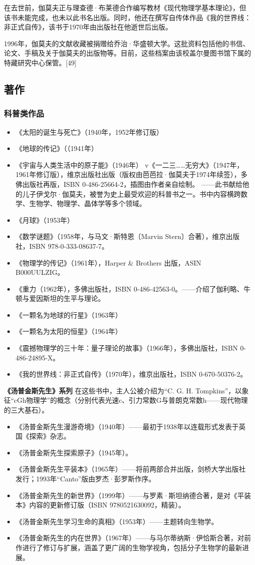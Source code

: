 在去世前，伽莫夫正与理查德·布莱德合作编写教材《现代物理学基本理论》，但该书未能完成，也未以此书名出版。同时，他还在撰写自传体作品《我的世界线：非正式自传》，该书于1970年由出版社在他逝世后出版。

1996年，伽莫夫的文献收藏被捐赠给乔治·华盛顿大学。这批资料包括他的书信、论文、手稿及关于伽莫夫的出版物等。目前，这些档案由该校盖尔曼图书馆下属的特藏研究中心保管。[49]
\subsection{著作}
\subsubsection{科普类作品}
\begin{itemize}
\item 《太阳的诞生与死亡》（1940年，1952年修订版）
\item 《地球的传记》（（1941年）
\item 《宇宙与人类生活中的原子能》（1946年）
v《一二三……无穷大》（1947年，1961年修订版），维京出版社出版（版权由芭芭拉·伽莫夫于1974年续签），多佛出版社再版，ISBN 0-486-25664-2，插图由作者亲自绘制。
  ——此书献给他的儿子伊戈尔·伽莫夫，被誉为史上最受欢迎的科普书之一。书中内容横跨数学、生物学、物理学、晶体学等多个领域。
\item 《月球》（1953年）
\item 《数学谜题》（1958年，与马文·斯特恩〔Marvin Stern〕合著），维京出版社，ISBN 978-0-333-08637-7。
\item 《物理学的传记》（1961年），Harper & Brothers 出版，ASIN B000UULZIG。
\item 《重力（1962年），多佛出版社，ISBN 0-486-42563-0。——介绍了伽利略、牛顿与爱因斯坦的生平与理论。
\item 《一颗名为地球的行星》（1963年）
\item 《一颗名为太阳的恒星》（1964年）
\item 《震撼物理学的三十年：量子理论的故事》（1966年），多佛出版社，ISBN 0-486-24895-X。
\item 《我的世界线：非正式自传》（1970年），维京出版社，ISBN 0-670-50376-2。
\end{itemize}
\textbf{《汤普金斯先生》系列}
在这些书中，主人公被介绍为“C. G. H. Tompkins”，以象征“cGh物理学”的概念（分别代表光速c、引力常数G与普朗克常数h——现代物理的三大基石）。
\begin{itemize}
\item 《汤普金斯先生漫游奇境》（1940年）——最初于1938年以连载形式发表于英国《探索》杂志。
\item 《汤普金斯先生探索原子》（1945年）。
\item 《汤普金斯先生平装本》（1965年）——将前两部合并出版，剑桥大学出版社发行；1993年“Canto”版由罗杰·彭罗斯作序。
\item 《汤普金斯先生的新世界》（1999年）——与罗素·斯坦纳德合著，是对《平装本》内容的更新修订版（ISBN 9780521630092，精装）。
\item 《汤普金斯先生学习生命的真相》（1953年）——主题转向生物学。
\item 《汤普金斯先生的内在世界》（1967年）——与马尔蒂纳斯·伊恰斯合著，对前作进行了修订与扩展，涵盖了更广阔的生物学视角，包括分子生物学的最新进展。
\end{itemize}
